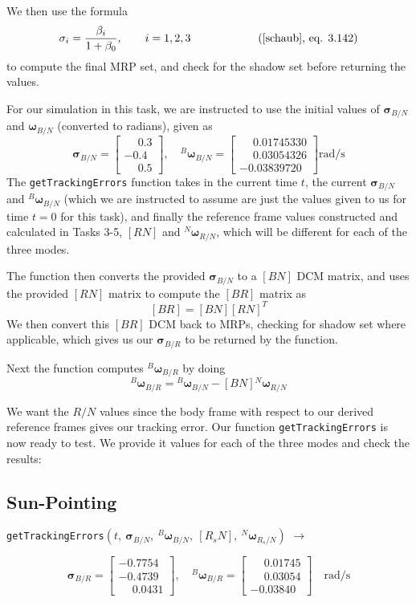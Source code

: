 \documentclass[conf]{new-aiaa}
\begin{document}
We then use the formula 
\[
\sigma_i = \frac{\beta_i}{1+\beta_0}, \qquad i=1,2,3 \qquad \qquad  \tag{\cite{schaub},~eq. 3.142} 
\]
to compute the final MRP set, and check for the shadow set before returning the values. 

For our simulation in this task, we are instructed to use the initial values of $\bm\sigma_{B/N}$ and $\bm\omega_{B/N}$ (converted to radians), given as
\[
\bm{\sigma}_{B/N} =
\begin{bmatrix}
\phantom{-}0.3 \\ -0.4 \\ \phantom{-}0.5
\end{bmatrix}, \quad
{}^B\bm{\omega}_{B/N} =
\begin{bmatrix}
\phantom{-}0.01745330 \\ \phantom{-}0.03054326 \\ -0.03839720
\end{bmatrix} \text{rad/s}
\]
The \texttt{getTrackingErrors} function takes in the current time $t$, the current $\bm\sigma_{B/N}$ and ${}^B\bm\omega_{B/N}$ (which we are instructed to assume are just the values given to us for time $t=0$ for this task), and finally the reference frame values constructed and calculated in Tasks 3-5, $[RN]$ and ${}^N\bm\omega_{R/N}$, which will be different for each of the three modes. 

The function then converts the provided $\bm\sigma_{B/N}$ to a $[BN]$ DCM matrix, and uses the provided $[RN]$ matrix to compute the $[BR]$ matrix as 
\[
[BR] = [BN][RN]^T
\]
We then convert this $[BR]$ DCM back to MRPs, checking for shadow set where applicable, which gives us our $\bm\sigma_{B/R}$ to be returned by the function. 

Next the function computes ${}^B\bm\omega_{B/R}$ by doing
\[
{}^B\bm\omega_{B/R} = {}^B\bm\omega_{B/N} - [BN]{}^N\bm\omega_{R/N}
\]

We want the $R/N$ values since the body frame with respect to our derived reference frames gives our tracking error. Our function \texttt{getTrackingErrors} is now ready to test. We provide it values for each of the three modes and check the results:
\subsection*{Sun-Pointing} 
\texttt{getTrackingErrors}\(\left(t,\ \bm{\sigma}_{B/N},\ {}^B\bm{\omega}_{B/N},\ [R_sN],\ {}^N\bm{\omega}_{R_s/N}\right)\) \(\rightarrow\)

\[
\bm\sigma_{B/R} =
\begin{bmatrix}
-0.7754 \\ -0.4739 \\ \phantom{-}0.0431
\end{bmatrix}, \quad
{}^B\bm\omega_{B/R} =
\begin{bmatrix}
\phantom{-}0.01745 \\ \phantom{-}0.03054 \\ -0.03840
\end{bmatrix} \quad \text{rad/s}
\]
\end{document}
